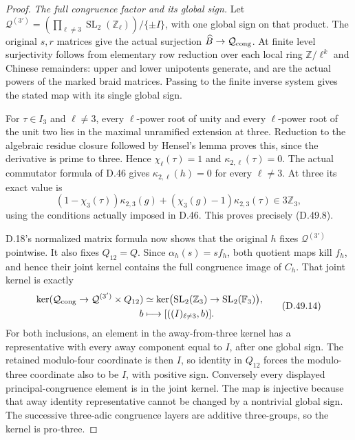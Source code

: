 \begin{proof}
\emph{The full congruence factor and its global sign.}
Let
\(\mathcal Q^{(3')}
 =(\prod_{\ell\ne3}\operatorname{SL}_2(\mathbb Z_\ell))
 /\{\pm I\}\), with one global sign on that product.
The original \(s,r\) matrices give the actual
surjection \(\widehat B\to\mathcal Q_{\rm cong}\).
At finite level surjectivity follows from elementary
row reduction over each local ring \(\mathbb Z/\ell^k\)
and Chinese remainders: upper and lower unipotents
generate, and are the actual powers of the marked
braid matrices. Passing to the finite inverse system
gives the stated map with its single global sign.

For \(\tau\in I_3\) and \(\ell\ne3\), every
\(\ell\)-power root of unity and every \(\ell\)-power
root of the unit two lies in the maximal unramified
extension at three. Reduction to the algebraic residue
closure followed by Hensel's lemma proves this, since
the derivative is prime to three. Hence
\(\chi_\ell(\tau)=1\) and
\(\kappa_{2,\ell}(\tau)=0\). The actual commutator
formula of D.46 gives \(\kappa_{2,\ell}(h)=0\)
for every \(\ell\ne3\). At three its exact value is
\[
 (1-\chi_3(\tau))\kappa_{2,3}(g)
       +(\chi_3(g)-1)\kappa_{2,3}(\tau)\in3\mathbb Z_3,
 \tag{D.49.13}
\]
using the conditions actually imposed in D.46.
This proves precisely (D.49.8).

D.18's normalized matrix formula now shows that
the original \(h\) fixes \(\mathcal Q^{(3')}\)
pointwise. It also fixes \(Q_{12}=Q\).
Since \(\alpha_h(s)=s f_h\), both quotient maps
kill \(f_h\), and hence their joint kernel contains
the full congruence image of \(C_h\).
That joint kernel is exactly
\[
 \begin{aligned}
 \ker(\mathcal Q_{\rm cong}\to
                  \mathcal Q^{(3')}\times Q_{12})
   &\simeq\ker\bigl(\operatorname{SL}_2(\mathbb Z_3)
                           \to\operatorname{SL}_2(\mathbb F_3)\bigr),\\
 b&\longmapsto[((I)_{\ell\ne3},b)].
 \end{aligned}
 \tag{D.49.14}
\]
For both inclusions, an element in the away-from-three
kernel has a representative with every away component
equal to \(I\), after one global sign. The retained
modulo-four coordinate is then \(I\), so identity
in \(Q_{12}\) forces the modulo-three coordinate
also to be \(I\), with positive sign. Conversely
every displayed principal-congruence element is
in the joint kernel. The map is injective because
that away identity representative cannot be changed
by a nontrivial global sign. The successive three-adic
congruence layers are additive three-groups, so the
kernel is pro-three.


\end{proof}
